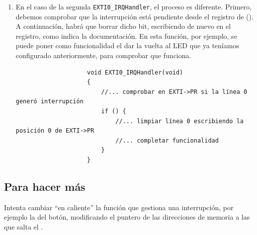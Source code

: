 \documentclass[../main.tex]{subfiles}
\begin{document}
\begin{enumerate}
                \begin{lstlisting}
                    void USART6_IRQHandler(void)
                    {
                        //... completar comprobar si el flag de interrupción está activo
                        if () {
                            //... completar leer el byte y retransmitirlo                        
                        } 
                    }
                \end{lstlisting}
            \item En el caso de la segunda \lstinline|EXTI0_IRQHandler|, el proceso es diferente. Primero, debemos comprobar que la interrupción está pendiente desde el registro  de  (\REFMAN[10.9.6]). A continuación, habrá que borrar dicho bit, escribiendo de nuevo en el registro, como indica la documentación. En esta función, por ejemplo, se puede poner como funcionalidad el dar la vuelta al LED que ya teníamos configurado anteriormente, para comprobar que funciona.
            
                \begin{lstlisting}
                    void EXTI0_IRQHandler(void)
                    {
                        //... comprobar en EXTI->PR si la línea 0 generó interrupción
                        if () {
                            //... limpiar línea 0 escribiendo la posición 0 de EXTI->PR
                            //... completar funcionalidad
                        }
                    }    
                \end{lstlisting}
                
        \end{enumerate}


    \subsection{Para hacer más}

        Intenta cambiar ``en caliente'' la función que gestiona una interrupción, por ejemplo la del botón, modificando el puntero de las direcciones de memoria a las que salta el .
\end{document}
